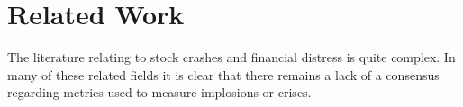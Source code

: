 \documentclass[a4paper]{report}
\begin{document}

\section{Related Work}
The literature relating to stock crashes and financial distress is quite complex. In many of these related fields it is clear that there remains a lack of a consensus regarding metrics used to measure implosions or crises.
\end{document}
